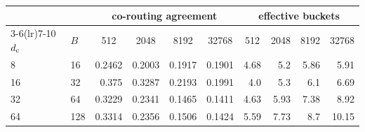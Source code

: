 \begin{tabular}{llrrrrrrrr}
\toprule
 & & \multicolumn{4}{c}{co-routing agreement} & \multicolumn{4}{c}{effective buckets} \\
\cmidrule(lr){3-6}\cmidrule(lr){7-10}
$d_{\mathrm{c}}$ & $B$ & \multicolumn{1}{c}{512} & \multicolumn{1}{c}{2048} & \multicolumn{1}{c}{8192} & \multicolumn{1}{c}{32768} & \multicolumn{1}{c}{512} & \multicolumn{1}{c}{2048} & \multicolumn{1}{c}{8192} & \multicolumn{1}{c}{32768} \\
\midrule
8 & 16 & 0.2462 & 0.2003 & 0.1917 & 0.1901 & 4.68 & 5.2 & 5.86 & 5.91 \\
16 & 32 & 0.375 & 0.3287 & 0.2193 & 0.1991 & 4.0 & 5.3 & 6.1 & 6.69 \\
32 & 64 & 0.3229 & 0.2341 & 0.1465 & 0.1411 & 4.63 & 5.93 & 7.38 & 8.92 \\
64 & 128 & 0.3314 & 0.2356 & 0.1506 & 0.1424 & 5.59 & 7.73 & 8.7 & 10.15 \\
\bottomrule
\end{tabular}